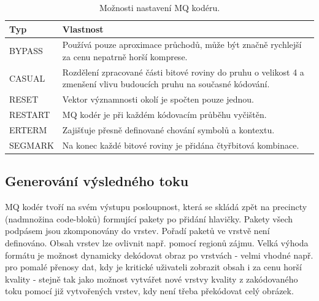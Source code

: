 \begin{table}[ht!]
  \centering
    \setlength{\tabcolsep}{3pt} %
    \renewcommand{\arraystretch}{1.15} %

    \begin{tabular}{|p{3cm}|p{11.5cm}|}
      \hline
      \textbf{Typ} & \textbf{Vlastnost} \\ 
      \hline

      BYPASS & Používá pouze aproximace průchodů, může být značně rychlejší za cenu nepatrně horší komprese.\\ 
      CASUAL & Rozdělení zpracované části bitové roviny do pruhu o velikost 4 a zmenšení vlivu budoucích pruhu na současné kódování.\\
      RESET & Vektor významnosti okolí je spočten pouze jednou.  \\ 
      RESTART & MQ kodér je při každém kódovacím průběhu vyčištěn. \\ 
      ERTERM & Zajišťuje přesně definované chování symbolů a kontextu. \\ 
      SEGMARK & Na konec každé bitové roviny je přidána čtyřbitová kombinace. \\
      \hline
    \end{tabular}
    \caption{Možnosti nastavení MQ kodéru.} 
\end{table}


\subsection*{Generování výsledného toku}
MQ kodér tvoří na svém výstupu posloupnost, která se skládá zpět na precincty (nadmnožina code-bloků) formující pakety po přidání hlavičky. Pakety všech podpásem jsou zkomponovány do vrstev. Pořadí paketů ve vrstvě není definováno. Obsah vrstev lze ovlivnit např. pomocí regionů zájmu. Velká výhoda formátu je možnost dynamicky dekódovat obraz po vrstvách - velmi vhodné např. pro pomalé přenosy dat, kdy je kritické uživateli zobrazit obsah i za cenu horší kvality - stejně tak jako možnost vytvářet nové vrstvy kvality z zakódovaného toku pomocí již vytvořených vrstev, kdy není třeba překódovat celý obrázek.

